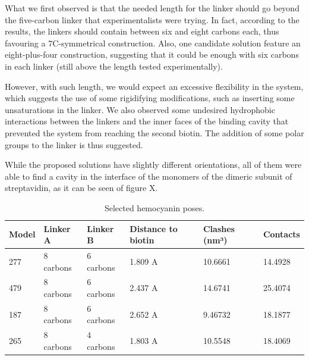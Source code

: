 What we first observed is that the needed length for the linker should go beyond the five-carbon linker that experimentalists were trying. In fact, according to the results, the linkers should contain between six and eight carbons each, thus favouring a 7C-symmetrical construction. Also, one candidate solution feature an eight-plus-four construction, suggesting that it could be enough with six carbons in each linker (still above the length tested experimentally).

However, with such length, we would expect an excessive flexibility in the system, which suggests the use of some rigidifying modifications, such as inserting some unsaturations in the linker. We also observed some undesired hydrophobic interactions between the linkers and the inner faces of the binding cavity that prevented the system from reaching the second biotin. The addition of some polar groups to the linker is thus suggested.

While the proposed solutions have slightly different orientations, all of them were able to find a cavity in the interface of the monomers of the dimeric subunit of streptavidin, as it can be seen of figure X.

\begin{table}[h]
\centering
\caption{Selected hemocyanin poses.}
\label{my-label}
\begin{tabular}{@{}llllll@{}}
\toprule
Model & Linker A  & Linker B  & Distance to biotin & Clashes (nm³) & Contacts \\ \midrule
277   & 8 carbons & 6 carbons & 1.809 A            & 10.6661       & 14.4928  \\
479   & 8 carbons & 6 carbons & 2.437 A            & 14.6741       & 25.4074  \\
187   & 8 carbons & 6 carbons & 2.652 A            & 9.46732       & 18.1877  \\
265   & 8 carbons & 4 carbons & 1.803 A            & 10.5548       & 18.4069  \\ \bottomrule
\end{tabular}
\end{table}
\begin{figure}
\noindent{}

\end{figure}
\begin{figure}
\noindent{}
\end{figure}


